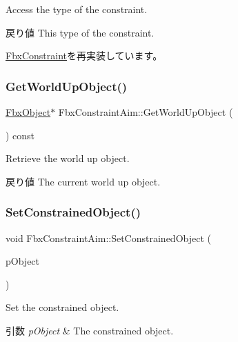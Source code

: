 Access the type of the constraint. \begin{DoxyReturn}{戻り値}
This type of the constraint. 
\end{DoxyReturn}


\hyperlink{class_fbx_constraint_adbeea66a1a605531a019aa6df90dc45b}{Fbx\+Constraint}を再実装しています。

\mbox{\label{class_fbx_constraint_aim_a3d795ffc5b595f49868c6e03a8a9245f}} 
\subsubsection{\texorpdfstring{Get\+World\+Up\+Object()}{GetWorldUpObject()}}
{\footnotesize\ttfamily \hyperlink{class_fbx_object}{Fbx\+Object}$\ast$ Fbx\+Constraint\+Aim\+::\+Get\+World\+Up\+Object (\begin{DoxyParamCaption}{ }\end{DoxyParamCaption}) const}

Retrieve the world up object. \begin{DoxyReturn}{戻り値}
The current world up object. 
\end{DoxyReturn}
\mbox{\label{class_fbx_constraint_aim_a52db6306c4245941b42b716522b105d8}} 
\subsubsection{\texorpdfstring{Set\+Constrained\+Object()}{SetConstrainedObject()}}
{\footnotesize\ttfamily void Fbx\+Constraint\+Aim\+::\+Set\+Constrained\+Object (\begin{DoxyParamCaption}\item[{\hyperlink{class_fbx_object}{Fbx\+Object} $\ast$}]{p\+Object }\end{DoxyParamCaption})}

Set the constrained object. 
\begin{DoxyParams}{引数}
{\em p\+Object} & The constrained object. \\
\hline
\end{DoxyParams}
\mbox{\label{class_fbx_constraint_aim_a866c7a2937ac681ec5024654ccc0c053}} 
